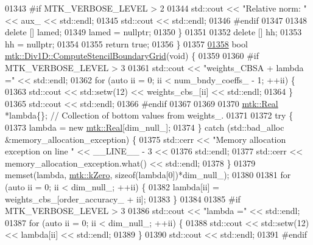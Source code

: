 \begin{DoxyCode}
{{01343 \textcolor{preprocessor}{    #if MTK\_VERBOSE\_LEVEL > 2}
01344     std::cout << \textcolor{stringliteral}{"Relative norm: "} << aux\_ << std::endl;
01345     std::cout << std::endl;
01346 \textcolor{preprocessor}{    #endif}
01347 
01348     \textcolor{keyword}{delete} [] lamed;
01349     lamed = \textcolor{keyword}{nullptr};
01350   \}
01351 
01352   \textcolor{keyword}{delete} [] hh;
01353   hh = \textcolor{keyword}{nullptr};
01354 
01355   \textcolor{keywordflow}{return} \textcolor{keyword}{true};
01356 \}
01357 
\hypertarget{mtk__div__1d_8cc_source_l01358}{}\hyperlink{classmtk_1_1Div1D_a29bb417c76286414dce9258a0bcb5aab}{01358} \textcolor{keywordtype}{bool} \hyperlink{classmtk_1_1Div1D_a29bb417c76286414dce9258a0bcb5aab}{mtk::Div1D::ComputeStencilBoundaryGrid}(\textcolor{keywordtype}{void}) \{
01359 
01360 \textcolor{preprocessor}{  #if MTK\_VERBOSE\_LEVEL > 3}
01361   std::cout << \textcolor{stringliteral}{"weights\_CBSA + lambda ="} << std::endl;
01362   \textcolor{keywordflow}{for} (\textcolor{keyword}{auto} ii = 0; ii < num\_bndy\_coeffs\_ - 1; ++ii) \{
01363     std::cout << std::setw(12) << weights\_cbs\_[ii] << std::endl;
01364   \}
01365   std::cout << std::endl;
01366 \textcolor{preprocessor}{  #endif}
01367 
01369 
01370   \hyperlink{group__c01-roots_gac080bbbf5cbb5502c9f00405f894857d}{mtk::Real} *lambda\{\}; \textcolor{comment}{// Collection of bottom values from weights\_.}
01371 
01372   \textcolor{keywordflow}{try} \{
01373     lambda = \textcolor{keyword}{new} \hyperlink{group__c01-roots_gac080bbbf5cbb5502c9f00405f894857d}{mtk::Real}[dim\_null\_];
01374   \} \textcolor{keywordflow}{catch} (std::bad\_alloc &memory\_allocation\_exception) \{
01375     std::cerr << \textcolor{stringliteral}{"Memory allocation exception on line "} << \_\_LINE\_\_ - 3 <<
01376       std::endl;
01377     std::cerr << memory\_allocation\_exception.what() << std::endl;
01378   \}
01379   memset(lambda, \hyperlink{group__c01-roots_ga59a451a5fae30d59649bcda274fea271}{mtk::kZero}, \textcolor{keyword}{sizeof}(lambda[0])*dim\_null\_);
01380 
01381   \textcolor{keywordflow}{for} (\textcolor{keyword}{auto} ii = 0; ii < dim\_null\_; ++ii) \{
01382     lambda[ii] = weights\_cbs\_[order\_accuracy\_ + ii];
01383   \}
01384 
01385 \textcolor{preprocessor}{  #if MTK\_VERBOSE\_LEVEL > 3}
01386   std::cout << \textcolor{stringliteral}{"lambda ="} << std::endl;
01387   \textcolor{keywordflow}{for} (\textcolor{keyword}{auto} ii = 0; ii < dim\_null\_; ++ii) \{
01388     std::cout << std::setw(12) << lambda[ii] << std::endl;
01389   \}
01390   std::cout << std::endl;
01391 \textcolor{preprocessor}{  #endif}
}}
\end{DoxyCode}
